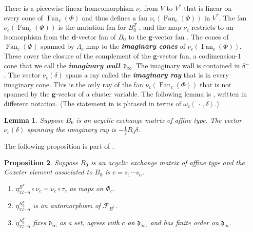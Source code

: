 \documentclass{amsart}
\newtheorem{proposition}{Proposition}[section]
\newtheorem{lemma}[proposition]{Lemma}
\theoremstyle{definition}
\theoremstyle{remark}
\numberwithin{equation}{section}
\newcommand{\newword}[1]{\textbf{\emph{#1}}}
\newcommand{\F}{{\mathcal F}}
\newcommand{\0}{{\mathbf{0}}}
\newcommand{\g}{\mathbf{g}}
\newcommand{\Fan}{\operatorname{Fan}}
\renewcommand{\d}{{\mathfrak d}}
\newcommand{\dd}{{\mathbf d}}
\newcommand{\RSChar}{\Phi}
\newcommand{\RS}{\RSChar}
\newcommand{\AP}[1]{\RS_{#1}}
\newcommand{\APTChar}{\Lambda}
\newcommand{\APT}[1]{\APTChar_{#1}}
\begin{document}
There is a piecewise linear homeomorphism $\nu_c$ from $V$ to $V^*$ that is linear on every cone of $\Fan_c(\RS)$ and thus defines a fan $\nu_c(\Fan_c(\RS))$ in $V^*$.
The fan $\nu_c(\Fan_c(\RS))$ is the mutation fan for $B_0^T$ \cite[Theorem~2.9]{affscat}, and the map $\nu_c$ restricts to an isomorphism from the $\dd$-vector fan of $B_0$ to the $\g$-vector fan \cite[Theorem~3.4]{affscat}. 
The cones of $\Fan_c(\RS)$ spanned by $\APT{c}$ map to the \newword{imaginary cones} of $\nu_c(\Fan_c(\RS))$.
These cover the closure of the complement of the $\g$-vector fan, a codimension-$1$ cone that we call the \newword{imaginary wall}~$\d_\infty$.
The imaginary wall is contained in $\delta^\perp$.
The vector $\nu_c(\delta)$ spans a ray called the \newword{imaginary ray} that is in every imaginary cone.
This is the only ray of the fan $\nu_c(\Fan_c(\RS))$ that is not spanned by the $\g$-vector of a cluster variable.
The following lemma is \cite[Lemma~5.9]{affscat}, written in different notation.
(The statement in \cite{affscat} is phrased in terms of $\omega_c(\,\cdot\,,\delta)$.)

\begin{lemma}\label{nu delta}  
Suppose $B_0$ is an acyclic exchange matrix of affine type.
The vector~$\nu_c(\delta)$ spanning the imaginary ray is $-\frac12B_0\delta$.
\end{lemma}

The following proposition is part of \cite[Proposition~7.33]{affscat}.

\begin{proposition}\label{eta nice} 
Suppose $B_0$ is an acyclic exchange matrix of affine type and the Coxeter element associated to $B_0$ is $c=s_1\cdots s_n$.
\begin{enumerate}[label=\bf\arabic*., ref=\arabic*]
\item \label{nu tau}   
$\eta^{B^T}_{12\cdots n}\circ\nu_c=\nu_c\circ\tau_c$ as maps on $\AP{c}$.
\item\label{eta aut mut}
$\eta^{B_0^T}_{12\cdots n}$ is an automorphism of $\F_{B^T}$.
\item\label{eta is c}
$\eta^{B_0^T}_{12\cdots n}$ fixes $\d_\infty$ as a set, agrees with $c$ on $\d_\infty$, and has finite order on $\d_\infty$.
\end{enumerate}
\end{proposition}
\end{document}
